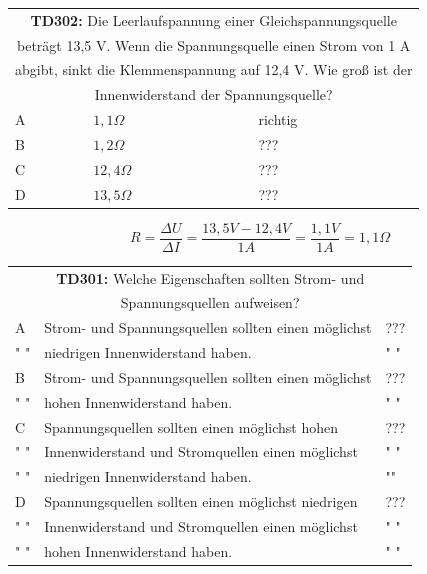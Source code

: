 \begin{frame}
	\begin{small}	
	\begin{tabular}{|l|l|l|}
	\hline
		\multicolumn{3}{|c|}{\textbf{TD302:} Die Leerlaufspannung einer Gleichspannungsquelle}\\
		\multicolumn{3}{|c|}{beträgt 13,5 V. Wenn die Spannungsquelle einen Strom von 1 A}\\
		\multicolumn{3}{|c|}{abgibt, sinkt die Klemmenspannung auf 12,4 V. Wie groß ist der}\\			\multicolumn{3}{|c|}{Innenwiderstand der Spannungsquelle?}\\
		\hline
		A & $1,1 \Omega$ & richtig \\ \hline
		B & $1,2 \Omega$ & ??? \\ \hline
		C & $12,4 \Omega$ & ??? \\ \hline
		D & $13,5 \Omega$ & ??? \\ \hline 		
	\end{tabular}
	\end{small}
	\vspace{1cm}
	\begin{equation}
		R = \frac{\Delta U}{\Delta I} = \frac{13,5V - 12,4V}{1A} = \frac{1,1V}{1A} = 1,1\Omega
	\end{equation}
\end{frame}

\begin{frame}
	\begin{small}	
	\begin{tabular}{|l|l|l|}
	\hline
		\multicolumn{3}{|c|}{\textbf{TD301:} Welche Eigenschaften sollten Strom- und}\\
		\multicolumn{3}{|c|}{Spannungsquellen aufweisen?}\\
		\hline
		A &  Strom- und Spannungsquellen sollten einen möglichst  & ??? \\
		" " & niedrigen Innenwiderstand haben. & " "\\ \hline
		B &  Strom- und Spannungsquellen sollten einen möglichst  & ??? \\
		" " & hohen Innenwiderstand haben. & " "\\ \hline
		C & Spannungsquellen sollten einen möglichst hohen & ??? \\
		" " & Innenwiderstand und Stromquellen einen möglichst  & " " \\ 
		" " & niedrigen Innenwiderstand haben.  & "" \\ \hline
		D & Spannungsquellen sollten einen möglichst niedrigen & ??? \\
		" " & Innenwiderstand und Stromquellen einen möglichst & " " \\ 
		" " & hohen Innenwiderstand haben.  & " " \\ \hline 		
	\end{tabular}
	\end{small}
\end{frame}

